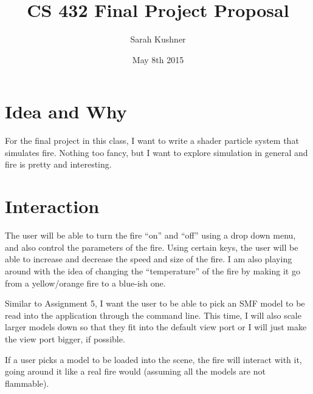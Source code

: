 \documentclass{article}
\begin{document}
\title{CS 432 Final Project Proposal}
\author{Sarah Kushner}
\date{May 8th 2015}
\maketitle

\section{Idea and Why}

For the final project in this class, I want to write a shader particle system that simulates fire. Nothing too fancy, but I want to explore simulation in general and fire is pretty and interesting.

\section{Interaction}

The user will be able to turn the fire ``on'' and ``off'' using a drop down menu, and also control the parameters of the fire. Using certain keys, the user will be able to increase and decrease the speed and size of the fire. I am also playing around with the idea of changing the ``temperature'' of the fire by making it go from a yellow/orange fire to a blue-ish one.

Similar to Assignment 5, I want the user to be able to pick an SMF model to be read into the application through the command line. This time, I will also scale larger models down so that they fit into the default view port or I will just make the view port bigger, if possible. 

If a user picks a model to be loaded into the scene, the fire will interact with it, going around it like a real fire would (assuming all the models are not flammable).
\end{document}
